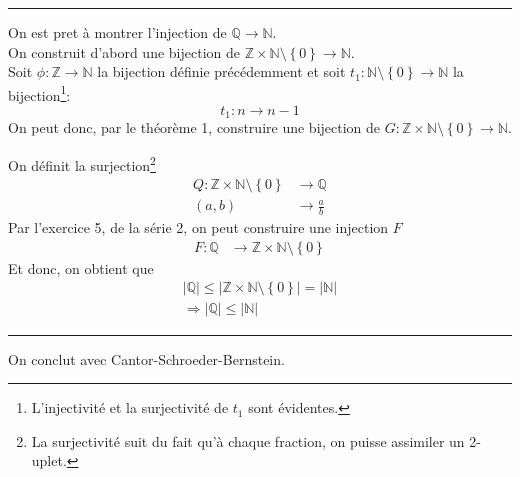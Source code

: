 \documentclass[11pt, a4paper, twoside]{article}
\newcommand\hr{
    \noindent\rule[0.5ex]{\linewidth}{0.5pt}\newline
}
\begin{document}
\hr
On est pret à montrer l'injection de $\mathbb{Q} \to \mathbb{N}$.\\
On construit d'abord une bijection de $ \mathbb{Z} \times \mathbb{N} \setminus \left\{ 0 \right\} \to \mathbb{N} $.\\
Soit $\phi: \mathbb{Z} \to \mathbb{N}$ la bijection définie précédemment et soit $t_1: \mathbb{N} \setminus \left\{ 0 \right\} \to \mathbb{N}$ la bijection\footnote{L'injectivité et la surjectivité de $t_1$ sont évidentes.}:
\[ 
t_1: n \to n-1
\]
On peut donc, par le théorème 1, construire une bijection de $G:\mathbb{Z} \times \mathbb{N} \setminus \left\{ 0 \right\} \to \mathbb{N} $.

On définit la surjection\footnote{La surjectivité suit du fait qu'à chaque fraction, on puisse assimiler un 2-uplet.}
 \begin{align*}
	 Q: \mathbb{Z} \times \mathbb{N} \setminus \left\{ 0 \right\} &\to \mathbb{Q}\\
	 ( a,b) & \to \frac{a}{b}
\end{align*}
Par l'exercice 5, de la série 2, on peut construire une injection $F$
\begin{align*}
	F: \mathbb{Q} &\to \mathbb{Z} \times \mathbb{N} \setminus \left\{ 0 \right\} 
\end{align*}
Et donc, on obtient que
\begin{align*}
|\mathbb{Q}| \leq |\mathbb{Z} \times \mathbb{N} \setminus \left\{ 0 \right\}| = |\mathbb{N}|\\
\Rightarrow | \mathbb{Q}| \leq |\mathbb{N}|
\end{align*}
\hr
On conclut avec Cantor-Schroeder-Bernstein.
\end{document}
